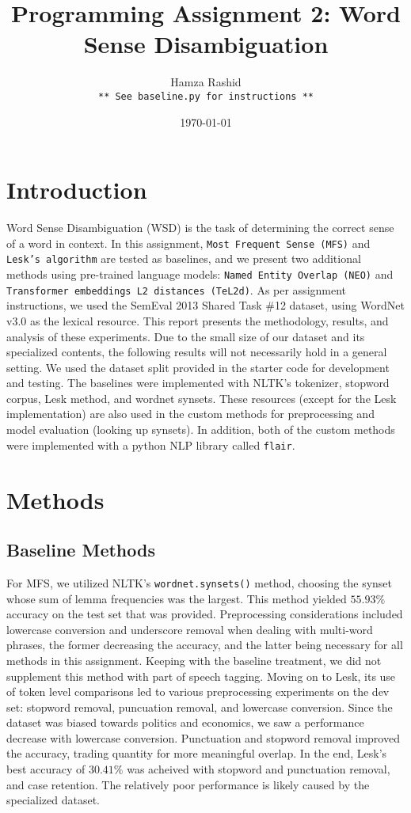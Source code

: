 \documentclass[11pt]{article}
\title{Programming Assignment 2: Word Sense Disambiguation}
\author{Hamza Rashid \\  \texttt{** See baseline.py for instructions **}}
\date{\today}
\begin{document}
\maketitle
\section{Introduction}
Word Sense Disambiguation (WSD) is the task of determining the correct sense of a word in context. 
In this assignment, \texttt{Most Frequent Sense (MFS)} and \texttt{Lesk’s algorithm} are tested as baselines, and we present
two additional methods using pre-trained language models: \texttt{Named Entity Overlap (NEO)} and \texttt{Transformer embeddings L2 distances (TeL2d)}.
As per assignment instructions, we used the SemEval 2013 Shared Task \#12 dataset, 
using WordNet v3.0 as the lexical resource. 
This report presents the methodology, results, and analysis of these experiments.
Due to the small size of our dataset 
and its specialized contents, the following results will not necessarily hold in a general setting. We used the dataset split provided in the starter code for development and testing. The
baselines were implemented with NLTK's tokenizer, stopword corpus, Lesk method, and wordnet synsets. 
These resources (except for the Lesk implementation) are also used in the custom methods for preprocessing
and model evaluation (looking up synsets). In addition, both of the custom methods were implemented with 
a python NLP library called \texttt{flair}.

\vspace{-2ex}
\section{Methods}
\subsection{Baseline Methods}
For MFS, we utilized NLTK's \texttt{wordnet.synsets()} method, choosing the synset whose sum of 
lemma frequencies was the largest. This method yielded $55.93\%$ accuracy on the test set that was provided. 
Preprocessing considerations included lowercase conversion and underscore removal when dealing with multi-word phrases,
the former decreasing the accuracy, and the latter being necessary for all methods in this assignment. 
Keeping with the baseline treatment, we did not supplement this method with part of speech tagging.
Moving on to Lesk, its use of token level comparisons led to various preprocessing experiments on the dev set: stopword removal, puncuation removal, and lowercase conversion. 
Since the dataset was biased towards politics and economics, we saw a performance decrease with lowercase conversion.
Punctuation and stopword removal improved the accuracy, trading quantity for more meaningful overlap.
In the end, Lesk's best accuracy of $30.41\%$ was acheived with stopword and punctuation removal,
and case retention. The relatively poor performance is likely caused by the specialized dataset. 
\end{document}

